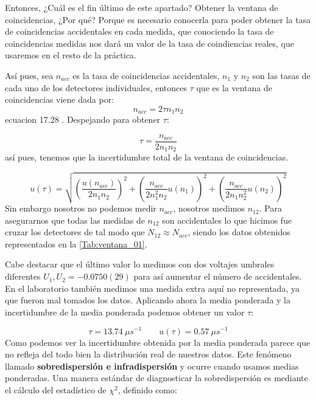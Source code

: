 \documentclass[11pt]{article}
\newcommand{\parentesis}[1]{\left( #1  \right)}
\begin{document}
Entonces, ¿Cuál es el fin último de este apartado? Obtener la ventana de coincidencias, ¿Por qué? Porque es necesario conocerla para poder obtener la tasa de coincidencias accidentales en cada medida, que conociendo la tasa de coincidencias medidas nos dará un valor de la tasa de coindiencias reales, que usaremos en el resto de la práctica.

Así pues, sea $n_{acc}$ es la tasa de coincidencias accidentales, $n_1$ y $n_2$ son las tasas de cada uno de los detectores individuales, entonces $\tau$ que es la ventana de coincidencias viene dada por:
\begin{equation}
	n_{acc} = 2 \tau  n_1 n_2
\end{equation}
ecuacion 17.28 \cite{Knoll:1300754}. Despejando para obtener $\tau$:

\begin{equation}
	\tau = \frac{n_{acc}}{2 n_1 n_2}
\end{equation}
así pues, tenemos que la incertidumbre total de la ventana de coincidencias.

\begin{equation}
	u(\tau) = \sqrt{\parentesis{\frac{u(n_{acc})}{2n_1n_2}}^2+\parentesis{\frac{n_{acc}}{2n_1^2n_2} u(n_1)}^2+\parentesis{\frac{n_{acc}}{2n_1n_2^2} u(n_2)}^2}
\end{equation}
Sin embargo nosotros no podemos medir $n_{acc}$, nosotros medimos $n_{12}$. Para asegurarnos que todas las medidas de $n_{12}$ son accidentales lo que hicimos fue cruzar los detectores de tal modo que $N_{12}\approx N_{acc}$, siendo los datos obtenidos representados en la \cref{Tab:ventana_01}.

\hspace*{-1.0cm} 

Cabe destacar que el último valor lo medimos con dos voltajes umbrales diferentes $U_1,U_2=-0.0750(29)$ para así aumentar el número de accidentales. En el laboratorio también medimos una medida extra aquí no representada, ya que fueron mal tomados los datos. Aplicando ahora la media ponderada y la incertidumbre de la media ponderada podemos obtener un valor $\tau$: 

\begin{equation}
	\tau = 13.74 \ \unit{\mu s^{-1}} \qquad  u(\tau) = 0.57  \ \unit{\mu s^{-1}}
\end{equation}
Como podemos ver la incertidumbre obtenida por la media ponderada parece que no refleja del todo bien la distribución real de nuestros datos. Este fenómeno llamado \textbf{sobredispersión e infradispersión} y ocurre cuando usamos medias ponderadas. 
Una manera estándar de diagnosticar la sobredispersión es mediante el cálculo del estadístico de \(\chi^2\), definido como:
\end{document}
